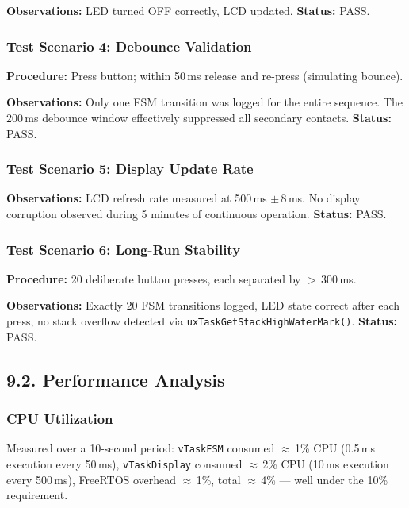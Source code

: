 \documentclass[12pt]{article}
\begin{document}
\textbf{Observations:} LED turned OFF correctly, LCD updated. \textbf{Status:} PASS.

\subsubsection*{Test Scenario 4: Debounce Validation}

\textbf{Procedure:} Press button; within 50\,ms release and re-press (simulating bounce).

\textbf{Observations:} Only one FSM transition was logged for the entire sequence. The 200\,ms debounce window effectively suppressed all secondary contacts. \textbf{Status:} PASS.

\subsubsection*{Test Scenario 5: Display Update Rate}

\textbf{Observations:} LCD refresh rate measured at 500\,ms $\pm$\,8\,ms. No display corruption observed during 5 minutes of continuous operation. \textbf{Status:} PASS.

\subsubsection*{Test Scenario 6: Long-Run Stability}

\textbf{Procedure:} 20 deliberate button presses, each separated by $>$\,300\,ms.

\textbf{Observations:} Exactly 20 FSM transitions logged, LED state correct after each press, no stack overflow detected via \texttt{uxTaskGetStackHighWaterMark()}. \textbf{Status:} PASS.

\subsection*{9.2. Performance Analysis}

\subsubsection*{CPU Utilization}

Measured over a 10-second period: \texttt{vTaskFSM} consumed $\approx$\,1\% CPU (0.5\,ms execution every 50\,ms), \texttt{vTaskDisplay} consumed $\approx$\,2\% CPU (10\,ms execution every 500\,ms), FreeRTOS overhead $\approx$\,1\%, total $\approx$\,4\% — well under the 10\% requirement.
\end{document}

